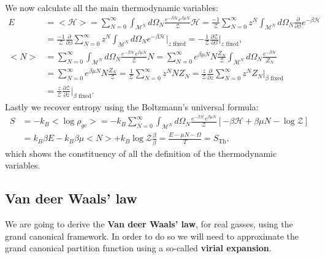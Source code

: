 We now calculate all the main thermodynamic variables:
\begin{align*}
    E&=<\mathcal{H} >=\sum_{N=0}^{\infty}\int_{\mathcal{M}^N}d\Omega_N\frac{e^{-\beta\mathcal{H} }e^{\beta\mu N}}{\mathcal{Z}}\mathcal{H} =\frac{-1}{\mathcal{Z}}\sum_{N=0}^{\infty}z^N\int_{\mathcal{M}^N}d\Omega_N\frac{\partial}{\partial\beta}e^{-\beta\mathcal{H} }\\&=\frac{-1}{\mathcal{Z}}\frac{\partial}{\partial\beta}\sum_{N=0}^{\infty}z^N\int_{\mathcal{M}^N}d\Omega_Ne^{-\beta\mathcal{H} }\bigg|_{z\text{ fixed}}=-\frac{1}{\mathcal{Z}}\frac{\partial\mathcal{Z}}{\partial\beta}\bigg|_{z\text{ fixed}},\\
    <N>&=\sum_{N=0}^{\infty}\int_{\mathcal{M}^N}d\Omega_N\frac{e^{-\beta\mathcal{H} }e^{\beta\mu N}}{\mathcal{Z}}N=\sum_{N=0}^{\infty}e^{\beta\mu N}N\frac{Z_N}{\mathcal{Z} }\int_{\mathcal{M}^N}d\Omega_N\frac{e^{-\beta\mathcal{H} }}{Z_N}\\&=\sum_{N=0}^{\infty}e^{\beta\mu N}N\frac{Z_N}{\mathcal{Z} }=\frac{1}{\mathcal{Z} }\sum_{N=0}^{\infty}z^NNZ_N=\frac{z}{\mathcal{Z} }\frac{\partial}{\partial z}\sum_{N=0}^{\infty}z^NZ_N\bigg|_{\beta\text{ fixed}}\\&=\frac{z}{\mathcal{Z} }\frac{\partial\mathcal{Z} }{\partial z}\bigg|_{\beta\text{ fixed}}.
\end{align*}
Lastly we recover entropy using the Boltzmann's universal formula:
\begin{align*}
    S&=-k_B<\log\rho_{gc}>=-k_B\sum_{N=0}^{\infty}\int_{\mathcal{M}^N}d\Omega_N\frac{e^{-\beta\mathcal{H} }e^{\beta\mu N}}{\mathcal{Z}}[-\beta\mathcal{H} +\beta\mu N-\log\mathcal{Z} ]\\&=k_B\beta E-k_B\beta\mu<N>+k_B\log{\mathcal{Z}}\frac{\beta}{\beta}=\frac{E-\mu N-\Omega}{T}=S_{\text{Th}},
\end{align*}
which shows the constituency of all the definition of the thermodynamic variables.
\subsection{Van deer Waals' law}
We are going to derive the \textbf{Van deer Waals' law}, for real gasses, using the grand canonical framework. In order to do so we will need to approximate the grand canonical partition function using a so-called \textbf{virial expansion}.\\


